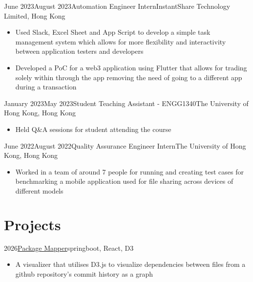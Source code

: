 \documentclass{cv}
\begin{document}
    \begin{employment}{June 2023}{August 2023}{Automation Engineer Intern}{InstantShare Technology Limited, Hong Kong}
	    \begin{itemize}
    	    \item Used Slack, Excel Sheet and App Script to develop a simple task management system which allows for more flexibility and interactivity between application testers and developers
            \item Developed a PoC for a web3 application using Flutter that allows for trading solely within through the app removing the need of going to a different app during a transaction
        \end{itemize}
	\end{employment}

    \begin{employment}{January 2023}{May 2023}{Student Teaching Assistant - ENGG1340}{The University of Hong Kong, Hong Kong}
	    \begin{itemize}
    	    \item Held Q\&A sessions for student attending the course
        \end{itemize}
	\end{employment}

    \begin{employment}{June 2022}{August 2022}{Quality Assurance Engineer Intern}{The University of Hong Kong, Hong Kong}
	    \begin{itemize}
    	    \item Worked in a team of around 7 people for running and creating test cases for benchmarking a mobile application used for file sharing across devices of different models
        \end{itemize}
	\end{employment}
	\vspace{0.2in}

    \section*{Projects}

    \begin{project}{2026}{\href{https://github.com/Nepranal/package-mapper}{Package Mapper}}{springboot, React, D3}
        \begin{itemize}
            \item A visualizer that utilises D3.js to visualize dependencies between files from a github repository's commit history as a graph
        \end{itemize}
	\end{project}
\end{document}
